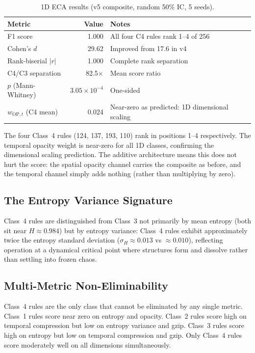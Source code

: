 \documentclass[12pt,a4paper]{article}
\begin{document}
\begin{table}[h]
\centering
\caption{1D ECA results (v5 composite, random 50\% IC, 5 seeds).}
\begin{tabular}{lrl}
\toprule
Metric & Value & Notes \\
\midrule
F1 score          & 1.000 & All four C4 rules rank 1--4 of 256 \\
Cohen's $d$       & 29.62 & Improved from 17.6 in v4 \\
Rank-biserial $|r|$ & 1.000 & Complete rank separation \\
C4/C3 separation  & 82.5$\times$ & Mean score ratio \\
$p$ (Mann-Whitney) & $3.05\times10^{-4}$ & One-sided \\
$w_{\text{OP},t}$ (C4 mean) & 0.024
  & Near-zero as predicted: 1D dimensional scaling \\
\bottomrule
\end{tabular}
\end{table}

The four Class~4 rules (124, 137, 193, 110) rank in positions 1--4
respectively.
The temporal opacity weight is near-zero for all 1D classes, confirming
the dimensional scaling prediction.
The additive architecture means this does not hurt the score: the
spatial opacity channel carries the composite as before, and the
temporal channel simply adds nothing (rather than multiplying by zero).

\subsection{The Entropy Variance Signature}

Class~4 rules are distinguished from Class~3 not primarily by mean
entropy (both sit near $H\approx0.984$) but by entropy variance:
Class~4 rules exhibit approximately twice the entropy standard
deviation ($\sigma_H\approx0.013$ vs $\approx0.010$), reflecting
operation at a dynamical critical point where structures form and
dissolve rather than settling into frozen chaos.

\subsection{Multi-Metric Non-Eliminability}

Class~4 rules are the only class that cannot be eliminated by any
single metric.
Class~1 rules score near zero on entropy and opacity.
Class~2 rules score high on temporal compression but low on entropy
variance and gzip.
Class~3 rules score high on entropy but low on temporal compression and
gzip.
Only Class~4 rules score moderately well on all dimensions
simultaneously.
\end{document}
